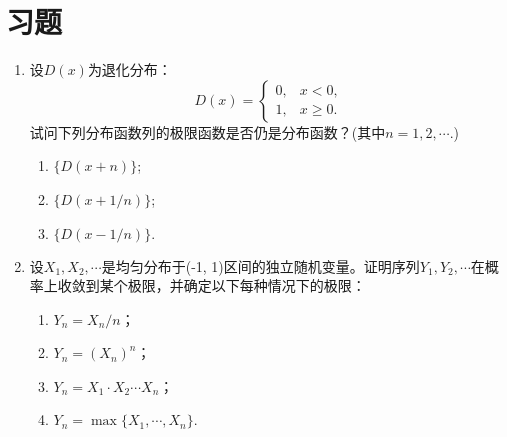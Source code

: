 \section{习题}
\begin{enumerate}
    \item 设$D(x)$为退化分布：
$$
D(x) = \left\{ 
	 \begin{matrix}
	 0, &  x < 0,\\
	 1, &  x\geq0.
	 \end{matrix} 
	 \right.
$$
试问下列分布函数列的极限函数是否仍是分布函数？(其中$n = 1,2,\cdots.$)
\begin{enumerate}
    \item $\{D(x + n)\}$;
\item $\{D(x + 1/n)\}$;
\item $\{D(x-1/n)\}.$
\end{enumerate}


\item 设$X_1,X_2,\cdots$是均匀分布于(-1, 1)区间的独立随机变量。证明序列$Y_1,Y_2,\cdots$在概率上收敛到某个极限，并确定以下每种情况下的极限：
\begin{enumerate}
    \item $Y_n = X_n/n$；
\item $Y_n =(X_n)^n$；
\item $Y_n = X_1\cdot X_2\cdots X_n$；
\item $Y_n = \max\{X_1,\cdots,X_n\}$.
\end{enumerate}

\end{enumerate}